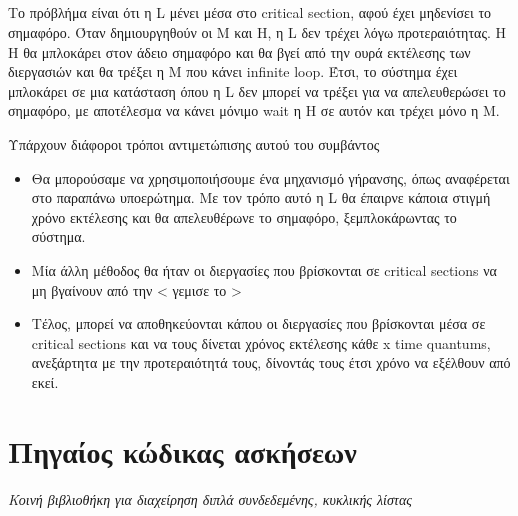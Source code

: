 \documentclass[a4paper,10pt]{article} \usepackage{anysize}
\begin{document}
\subsection{}
Το πρόβλήμα είναι ότι η L μένει μέσα στο critical section, αφού έχει μηδενίσει
το σημαφόρο. Όταν δημιουργηθούν οι Μ και H, η L δεν τρέχει λόγω
προτεραιότητας. Η H θα μπλοκάρει στον άδειο σημαφόρο και θα βγεί από την ουρά
εκτέλεσης των διεργασιών και θα τρέξει η M που κάνει infinite loop. Έτσι, το
σύστημα έχει μπλοκάρει σε μια κατάσταση όπου η L δεν μπορεί να τρέξει για να
απελευθερώσει το σημαφόρο, με αποτέλεσμα να κάνει μόνιμο wait η H σε αυτόν και
τρέχει μόνο η M.

Υπάρχουν διάφοροι τρόποι αντιμετώπισης αυτού του συμβάντος
\begin{itemize}
\item Θα μπορούσαμε να χρησιμοποιήσουμε ένα μηχανισμό γήρανσης, όπως
αναφέρεται στο παραπάνω υποερώτημα. Με τον τρόπο αυτό η L θα έπαιρνε κάποια
στιγμή χρόνο εκτέλεσης και θα απελευθέρωνε το σημαφόρο, ξεμπλοκάρωντας το
σύστημα.
\item Μία άλλη μέθοδος θα ήταν οι διεργασίες που βρίσκονται σε critical
sections να μη βγαίνουν από την < γεμισε το >
\item Τέλος, μπορεί να αποθηκεύονται κάπου οι διεργασίες που βρίσκονται μέσα
σε critical sections και να τους δίνεται χρόνος εκτέλεσης κάθε x time
quantums, ανεξάρτητα με την προτεραιότητά τους, δίνοντάς τους έτσι χρόνο να
εξέλθουν από εκεί.

\end{itemize}

\vspace{1cm}
\def\thesubsection {Άσκηση \arabic{section}.\arabic{subsection}}
\section*{Πηγαίος κώδικας ασκήσεων}
\emph{Κοινή βιβλιοθήκη για διαχείρηση διπλά συνδεδεμένης, κυκλικής λίστας}
\inputminted[linenos,fontsize=\footnotesize,frame=leftline]{c}{files/queue.h}
\inputminted[linenos,fontsize=\footnotesize,frame=leftline]{c}{files/queue.c}
\setcounter{section}{1}
\setcounter{subsection}{0}
\subsection{}
\inputminted[linenos,fontsize=\footnotesize,frame=leftline]{c}{files/scheduler_1.1.c}
\subsection{}
\inputminted[linenos,fontsize=\footnotesize,frame=leftline]{c}{files/scheduler-shell_1.2.c}
\end{document}

